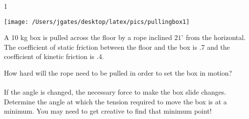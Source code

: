 
\AddToShipoutPicture*{\BackgroundPic}

\addtocounter {ProbNum} {1}

\begin{floatingfigure}[r]{.35\textwidth}
\texttt{[image: /Users/jgates/desktop/latex/pics/pullingbox1]}
\end{floatingfigure}
 
{\bf \Large{}} A 10 kg box is pulled across the floor by a rope inclined ${21^{\circ}}$ from the horizontal. The coefficient of static friction between the floor and the box is .7 and the coefficient of kinetic friction is .4. 

\bigskip
How hard will the rope need to be pulled in order to set the box in motion?
\paragraph{}
\noindent
\vfill

If the angle is changed, the necessary force to make the box slide changes. Determine the angle at which the tension required to move the box is at a minimum.  You may need to get creative to find that minimum point!
\vfill

\newpage